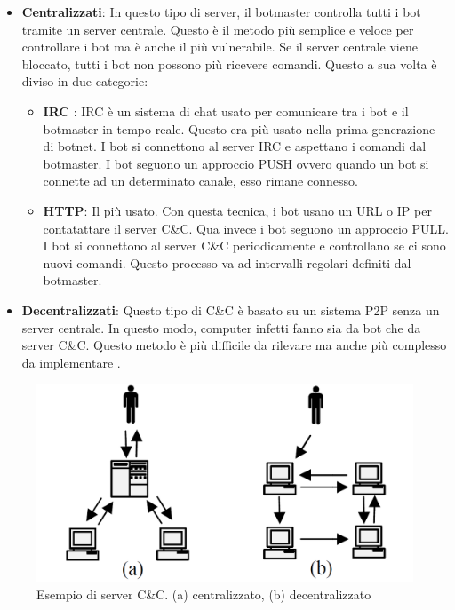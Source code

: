 \documentclass[12pt,a4paper,openright,twoside]{book}
\begin{document}
\begin{itemize}
    \item \textbf{Centralizzati}: In questo tipo di server, il botmaster
    controlla tutti i bot tramite un server centrale. Questo è il metodo
    più semplice e veloce per controllare i bot ma è anche il più vulnerabile.
    Se il server centrale viene bloccato, tutti i bot non possono più
    ricevere comandi. Questo a sua volta è diviso in due categorie:
    \begin{itemize}
        \item \textbf{IRC} : \acrfull{IRC} è un sistema di chat
        usato per comunicare tra i bot e il botmaster in tempo reale.
        Questo era più usato nella prima generazione di botnet. 
        I bot si connettono al server \acrshort{IRC} e aspettano
        i comandi dal botmaster. I bot seguono un approccio PUSH ovvero
        quando un bot si connette ad un determinato canale, esso rimane connesso.
        \item \textbf{HTTP}: Il più usato. Con questa tecnica, i bot usano un URL o IP
        per contatattare il server \acrshort{C&C}. Qua invece i bot seguono
        un approccio PULL. I bot si connettono al server \acrshort{C&C}
        periodicamente e controllano se ci sono nuovi comandi. Questo processo
        va ad intervalli regolari definiti dal botmaster.
    \end{itemize}

    \item \textbf{Decentralizzati}: Questo tipo di \acrshort{C&C}
    è basato su un sistema \acrshort{P2P} senza un server centrale. In questo modo,
    computer infetti fanno sia da bot che da server \acrshort{C&C}.
    Questo metodo è più difficile da rilevare ma anche
    più complesso da implementare \cite{4804459}.

\end{itemize}

\begin{figure}
    \centering
    \includegraphics[width=.8\linewidth]{figures/Types-of-CC.png}
    \caption{Esempio di server \acrshort{C&C}. (a) centralizzato, (b) decentralizzato \cite{6487169}}
    \label{fig:command and control}
\end{figure}
\end{document}
